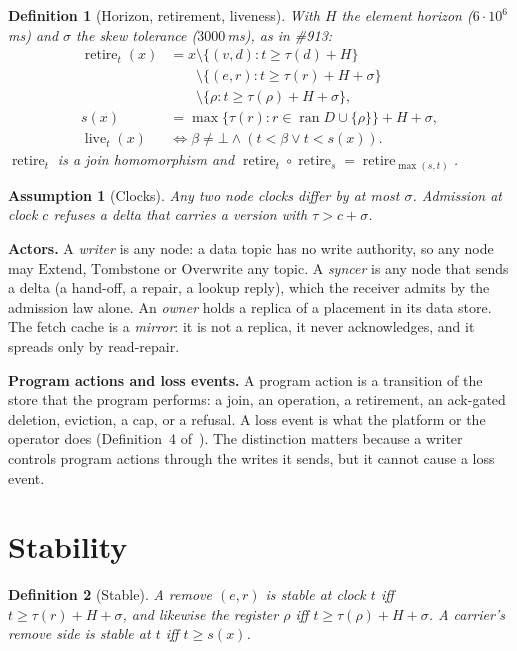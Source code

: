 \documentclass[journal]{IEEEtran}
\newtheorem{definition}{Definition}
\newtheorem{assumption}{Assumption}
\newcommand{\ret}{\operatorname{retire}}
\newcommand{\live}{\operatorname{live}}
\newcommand{\issue}[1]{\#{#1}}
\begin{document}
\begin{definition}[Horizon, retirement, liveness]\label{def:retire}
With $H$ the element horizon ($6\cdot10^6$\,ms) and $\sigma$ the skew tolerance
($3000$\,ms), as in \issue{913}:
\begin{align*}
\ret_t(x)&=x\setminus\{(v,d):t\ge\tau(d)+H\}\\
&\phantom{{}=x}\setminus\{(e,r):t\ge\tau(r)+H+\sigma\}\\
&\phantom{{}=x}\setminus\{\rho:t\ge\tau(\rho)+H+\sigma\},\\
s(x)&=\max\{\tau(r):r\in\operatorname{ran}D\cup\{\rho\}\}+H+\sigma,\\
\live_t(x)&\iff\beta\ne\bot\wedge(t<\beta\vee t<s(x)).
\end{align*}
$\ret_t$ is a join homomorphism and $\ret_t\circ\ret_s=\ret_{\max(s,t)}$.
\end{definition}

\begin{assumption}[Clocks]\label{as:clock}
Any two node clocks differ by at most $\sigma$.  Admission at clock $c$ refuses a delta that
carries a version with $\tau>c+\sigma$.
\end{assumption}

\textbf{Actors.}  A \emph{writer} is any node: a data topic has no write authority, so any
node may $\mathrm{Extend}$, $\mathrm{Tombstone}$ or $\mathrm{Overwrite}$ any topic.  A
\emph{syncer} is any node that sends a delta (a hand-off, a repair, a lookup reply), which
the receiver admits by the admission law alone.  An \emph{owner} holds a replica of a
placement in its data store.  The fetch cache is a \emph{mirror}: it is not a replica, it
never acknowledges, and it spreads only by read-repair.

\textbf{Program actions and loss events.}  A program action is a transition of the store
that the program performs: a join, an operation, a retirement, an ack-gated deletion,
eviction, a cap, or a refusal.  A loss event is what the platform or the operator does
(Definition~4 of~\cite{DurableRecords}).  The distinction matters because a writer controls
program actions through the writes it sends, but it cannot cause a loss event.

\section{Stability}\label{sec:stable}

\begin{definition}[Stable]\label{def:stable}
A remove $(e,r)$ is \emph{stable} at clock $t$ iff $t\ge\tau(r)+H+\sigma$, and likewise the
register $\rho$ iff $t\ge\tau(\rho)+H+\sigma$.  A carrier's remove side is stable at $t$ iff
$t\ge s(x)$.
\end{definition}
\end{document}

